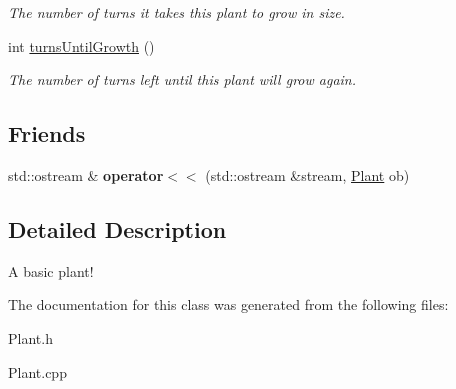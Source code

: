 \begin{DoxyCompactItemize}
\begin{DoxyCompactList}\small\item\em \-The number of turns it takes this plant to grow in size. \end{DoxyCompactList}\item 
\hypertarget{classPlant_a9e262ea9422e8ee869619229f88e5b14}{int \hyperlink{classPlant_a9e262ea9422e8ee869619229f88e5b14}{turns\-Until\-Growth} ()}\label{classPlant_a9e262ea9422e8ee869619229f88e5b14}

\begin{DoxyCompactList}\small\item\em \-The number of turns left until this plant will grow again. \end{DoxyCompactList}\end{DoxyCompactItemize}
\subsection*{\-Friends}
\begin{DoxyCompactItemize}
\item 
\hypertarget{classPlant_a4c9744505ff341c3e69530a5f44733f5}{std\-::ostream \& {\bfseries operator$<$$<$} (std\-::ostream \&stream, \hyperlink{classPlant}{\-Plant} ob)}\label{classPlant_a4c9744505ff341c3e69530a5f44733f5}

\end{DoxyCompactItemize}


\subsection{\-Detailed \-Description}
\-A basic plant! 

\-The documentation for this class was generated from the following files\-:\begin{DoxyCompactItemize}
\item 
\-Plant.\-h\item 
\-Plant.\-cpp\end{DoxyCompactItemize}
